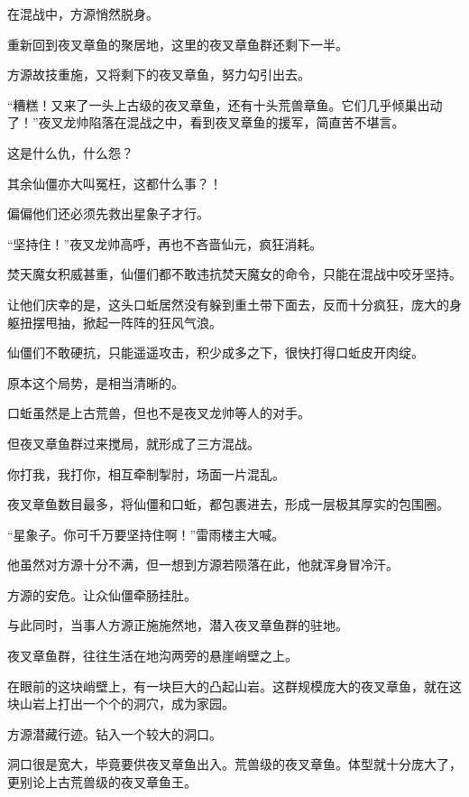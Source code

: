 
\begin{this_body}



在混战中，方源悄然脱身。

重新回到夜叉章鱼的聚居地，这里的夜叉章鱼群还剩下一半。

方源故技重施，又将剩下的夜叉章鱼，努力勾引出去。

“糟糕！又来了一头上古级的夜叉章鱼，还有十头荒兽章鱼。它们几乎倾巢出动了！”夜叉龙帅陷落在混战之中，看到夜叉章鱼的援军，简直苦不堪言。

这是什么仇，什么怨？

其余仙僵亦大叫冤枉，这都什么事？！

偏偏他们还必须先救出星象子才行。

“坚持住！”夜叉龙帅高呼，再也不吝啬仙元，疯狂消耗。

焚天魔女积威甚重，仙僵们都不敢违抗焚天魔女的命令，只能在混战中咬牙坚持。

让他们庆幸的是，这头口蚯居然没有躲到重土带下面去，反而十分疯狂，庞大的身躯扭摆甩抽，掀起一阵阵的狂风气浪。

仙僵们不敢硬抗，只能遥遥攻击，积少成多之下，很快打得口蚯皮开肉绽。

原本这个局势，是相当清晰的。

口蚯虽然是上古荒兽，但也不是夜叉龙帅等人的对手。

但夜叉章鱼群过来搅局，就形成了三方混战。

你打我，我打你，相互牵制掣肘，场面一片混乱。

夜叉章鱼数目最多，将仙僵和口蚯，都包裹进去，形成一层极其厚实的包围圈。

“星象子。你可千万要坚持住啊！”雷雨楼主大喊。

他虽然对方源十分不满，但一想到方源若陨落在此，他就浑身冒冷汗。

方源的安危。让众仙僵牵肠挂肚。

与此同时，当事人方源正施施然地，潜入夜叉章鱼群的驻地。

夜叉章鱼群，往往生活在地沟两旁的悬崖峭壁之上。

在眼前的这块峭壁上，有一块巨大的凸起山岩。这群规模庞大的夜叉章鱼，就在这块山岩上打出一个个的洞穴，成为家园。

方源潜藏行迹。钻入一个较大的洞口。

洞口很是宽大，毕竟要供夜叉章鱼出入。荒兽级的夜叉章鱼。体型就十分庞大了，更别论上古荒兽级的夜叉章鱼王。


\end{this_body}
